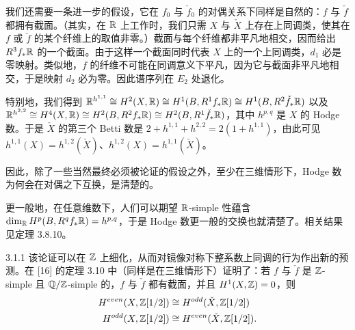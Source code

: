 
我们还需要一条进一步的假设，它在 $f_0$ 与 $\check f_0$ 的对偶关系下同样是自然的：$f$ 与 $\check f$ 都拥有截面。（其实，在 $\mathbb{R}$ 上工作时，我们只需 $X$ 与 $\check X$ 上存在上同调类，使其在 $f$ 或 $\check f$ 的某个纤维上的取值非零。）截面与每个纤维都非平凡地相交，因而给出 $R^3f_*\mathbb{R}$ 的一个截面。由于这样一个截面同时代表 $X$ 上的一个上同调类，$d_1$ 必是零映射。类似地，$f$ 的纤维不可能在同调意义下平凡，因为它与截面非平凡地相交，于是映射 $d_2$ 必为零。因此谱序列在 $E_2$ 处退化。

特别地，我们得到 $\mathbb{R}^{h^{1,1}}\cong H^2(X,\mathbb{R})\cong H^1(B,R^1f_*\mathbb{R})\cong H^1(B,R^2\check f_*\mathbb{R})$ 以及 $\mathbb{R}^{h^{2,2}}\cong H^4(X,\mathbb{R})\cong H^2(B,R^2f_*\mathbb{R})\cong H^2(B,R^1\check f_*\mathbb{R})$，其中 $h^{p,q}$ 是 $X$ 的 Hodge 数。于是 $\check X$ 的第三个 Betti 数是 $2+h^{1,1}+h^{2,2}=2(1+h^{1,1})$，由此可见 $h^{1,1}(X)=h^{1,2}(\check X)$、$h^{1,2}(X)=h^{1,1}(\check X)$。


因此，除了一些当然最终必须被论证的假设之外，至少在三维情形下，Hodge 数为何会在对偶之下互换，是清楚的。

更一般地，在任意维数下，人们可以期望 $\mathbb{R}$-simple 性蕴含 $\dim_{\mathbb{R}}H^p(B,R^qf_*\mathbb{R})=h^{p,q}$，于是 Hodge 数更一般的交换也就清楚了。相关结果见定理 3.8.10。

\begin{remark}{3.1.1}
该论证可以在 $\mathbb{Z}$ 上细化，从而对镜像对称下整系数上同调的行为作出新的预测。在 [16] 的定理 3.10 中（同样是在三维情形下）证明了：若 $f$ 与 $\check f$ 是 $\mathbb{Z}$-simple
且 $\mathbb{Q}/\mathbb{Z}$-simple 的，$f$ 与 $\check f$ 都有截面，并且 $H^1(X,\mathbb{Z})=0$，则
\begin{align*}
H^{even}(X,\mathbb{Z}[1/2]) &\cong H^{odd}(\check X,\mathbb{Z}[1/2])\\
H^{odd}(X,\mathbb{Z}[1/2]) &\cong H^{even}(\check X,\mathbb{Z}[1/2]).
\end{align*}
\end{remark}


